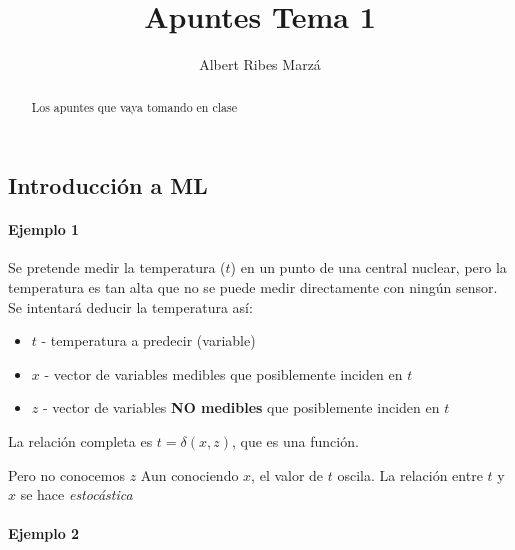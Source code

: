 \documentclass[a4paper,10pt]{article}
\title{Apuntes Tema 1}
\author{Albert Ribes Marzá}
\begin{document}
\maketitle

\begin{abstract}
Los apuntes que vaya tomando en clase
\end{abstract}

\section{}
\subsection{Introducción a ML}
\paragraph{Ejemplo 1}
Se pretende medir la temperatura ($t$) en un punto de una central nuclear, pero la temperatura es tan alta que no se puede medir directamente con ningún sensor. Se intentará deducir la temperatura así:
\begin{itemize}
\item $t$ - temperatura a predecir (variable)
\item $x$ - vector de variables medibles que posiblemente inciden en $t$
\item $z$ - vector de variables \textbf{NO medibles} que posiblemente inciden en $t$
\end{itemize}

La relación completa es $ t = \delta(x,z)$, que es una función.

Pero no conocemos $z$ \MVRightarrow Aun conociendo $x$, el valor de $t$ oscila. La relación entre $t$ y $x$ se hace \textit{estocástica}



\paragraph{Ejemplo 2}
\end{document}
